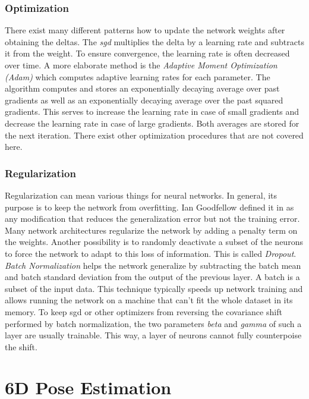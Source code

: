 \subsubsection{Optimization} There exist many different patterns how to update the network weights after obtaining the deltas. The \textit{\ac{sgd}} multiplies the delta by a learning rate and subtracts it from the weight. To ensure convergence, the learning rate is often decreased over time. A more elaborate method is the \textit{Adaptive Moment Optimization (Adam)} \cite{adam} which computes adaptive learning rates for each parameter. The algorithm computes and stores an exponentially decaying average over past gradients as well as an exponentially decaying average over the past squared gradients. This serves to increase the learning rate in case of small gradients and decrease the learning rate in case of large gradients. Both averages are stored for the next iteration. There exist other optimization procedures that are not covered here.
	
\subsubsection{Regularization} Regularization can mean various things for neural networks. In general, its purpose is to keep the network from overfitting. Ian Goodfellow defined it in \cite{goodfellow} as any modification that reduces the generalization error but not the training error. Many network architectures regularize the network by adding a penalty term on the weights. Another possibility is to randomly deactivate a subset of the neurons to force the network to adapt to this loss of information. This is called \textit{Dropout}. \textit{Batch Normalization} helps the network generalize by subtracting the batch mean and batch standard deviation from the output of the previous layer. A batch is a subset of the input data. This technique typically speeds up network training and allows running the network on a machine that can't fit the whole dataset in its memory. To keep \ac{sgd} or other optimizers from reversing the covariance shift performed by batch normalization, the two parameters \textit{beta} and \textit{gamma} of such a layer are usually trainable. This way, a layer of neurons cannot fully counterpoise the shift. 

\section{6D Pose Estimation}

